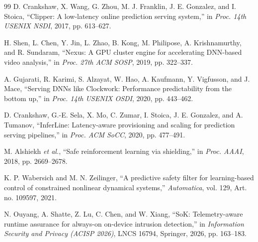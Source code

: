 \documentclass[10pt,journal]{IEEEtran}
\begin{document}
\begin{thebibliography}{99}
D. Crankshaw, X. Wang, G. Zhou, M. J. Franklin,
J. E. Gonzalez, and I. Stoica,
``Clipper: A low-latency online prediction serving system,''
in \emph{Proc. 14th USENIX NSDI}, 2017, pp. 613--627.

H. Shen, L. Chen, Y. Jin, L. Zhao, B. Kong, M. Philipose,
A. Krishnamurthy, and R. Sundaram,
``Nexus: A GPU cluster engine for accelerating DNN-based video
analysis,''
in \emph{Proc. 27th ACM SOSP}, 2019, pp. 322--337.

A. Gujarati, R. Karimi, S. Alzayat, W. Hao, A. Kaufmann,
Y. Vigfusson, and J. Mace,
``Serving DNNs like Clockwork: Performance predictability from the
bottom up,''
in \emph{Proc. 14th USENIX OSDI}, 2020, pp. 443--462.

D. Crankshaw, G.-E. Sela, X. Mo, C. Zumar, I. Stoica,
J. E. Gonzalez, and A. Tumanov,
``InferLine: Latency-aware provisioning and scaling for prediction
serving pipelines,''
in \emph{Proc. ACM SoCC}, 2020, pp. 477--491.

M. Alshiekh \emph{et al.},
``Safe reinforcement learning via shielding,''
in \emph{Proc. AAAI}, 2018, pp. 2669--2678.

K. P. Wabersich and M. N. Zeilinger,
``A predictive safety filter for learning-based control of constrained
nonlinear dynamical systems,''
\emph{Automatica}, vol. 129, Art. no. 109597, 2021.

N. Ouyang, A. Shatte, Z. Lu, C. Chen, and W. Xiang,
``SoK: Telemetry-aware runtime assurance for always-on on-device
intrusion detection,''
in \emph{Information Security and Privacy (ACISP 2026)},
LNCS 16794, Springer, 2026, pp. 163--183.

\end{thebibliography}
\end{document}

